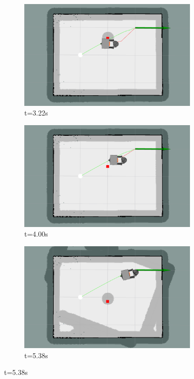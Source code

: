 \begin{figure}[H]
\begin{subfigure}[b]{0.30\linewidth}
    \end{subfigure}
    \begin{subfigure}[b]{0.30\linewidth}
        \centering
        \includegraphics[width=0.95\textwidth]{images/eband_single_1_obs/1/3322.png} \caption{t=3.22s}\label{subfig:eband_test_case_1_exp_1_collision}
    \end{subfigure}%
    \begin{subfigure}[b]{0.30\linewidth}
        \centering
        \includegraphics[width=0.95\textwidth]{images/eband_single_1_obs/1/3400.png} \caption{t=4.00s}
    \end{subfigure}%
    \begin{subfigure}[b]{0.30\linewidth}
        \centering
        \includegraphics[width=0.95\textwidth]{images/eband_single_1_obs/1/3538.png} \caption{t=5.38s}

\end{subfigure}
\end{figure}
